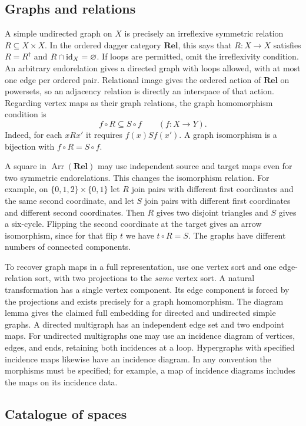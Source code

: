 \subsection{Graphs and relations}
\label{sec-osa-graphs}

A simple undirected graph on $X$ is precisely an irreflexive symmetric
relation $R\subseteq X\times X$. In the ordered dagger category
$\mathbf{Rel}$, this says that $R:X\to X$ satisfies
$R=R^{\dagger}$ and $R\cap{\operatorname{id}}_X=\varnothing$. If loops are permitted,
omit the irreflexivity condition. An arbitrary endorelation gives a
directed graph with loops allowed, with at most one edge per ordered
pair. Relational image gives the ordered action of $\mathbf{Rel}$ on
powersets, so an adjacency relation is directly an interspace of that
action. Regarding vertex maps as their graph relations, the graph
homomorphism condition is
\[
 f\circ R\subseteq S\circ f\qquad(f:X\to Y).
\]
Indeed, for each $xRx'$ it requires $f(x)S f(x')$. A graph isomorphism
is a bijection with $f\circ R=S\circ f$.

A square in $\operatorname{Arr}(\mathbf{Rel})$ may use independent
source and target maps even for two symmetric endorelations. This changes
the isomorphism relation. For example, on
$\{0,1,2\}\times\{0,1\}$ let $R$ join pairs with different first
coordinates and the same second coordinate, and let $S$ join pairs
with different first coordinates and different second coordinates.
Then $R$ gives two disjoint triangles and $S$ gives a six-cycle.
Flipping the second coordinate at the target gives an arrow
isomorphism, since for that flip $t$ we have $t\circ R=S$. The graphs
have different numbers of connected components.

To recover graph maps in a full representation, use one vertex sort
and one edge-relation sort, with two projections to the \emph{same}
vertex sort. A natural transformation has a single vertex component.
Its edge component is forced by the projections and exists precisely for
a graph homomorphism. The diagram lemma gives the claimed full embedding
for directed and undirected simple graphs. A directed multigraph has an
independent edge set and two endpoint maps. For undirected multigraphs
one may use an incidence diagram of vertices, edges, and ends, retaining
both incidences at a loop. Hypergraphs with specified incidence maps
likewise have an incidence diagram. In any convention the morphisms must
be specified; for example, a map of incidence diagrams includes the
maps on its incidence data.

\subsection{Catalogue of spaces}


